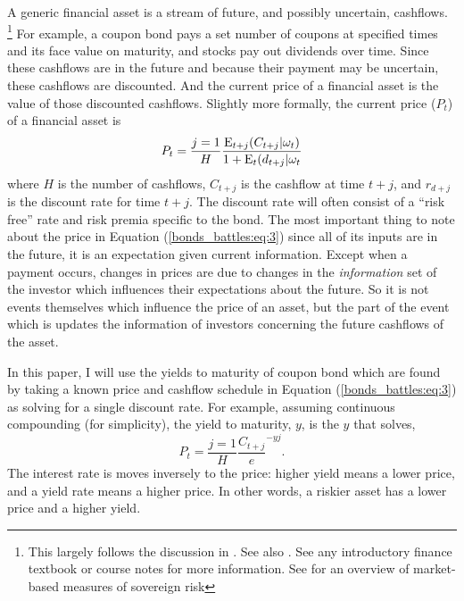 A generic financial asset is a stream of future, and possibly uncertain, cashflows.%
\footnote{
  This largely follows the discussion in \textcite[673]{GuidolinLaFerrara2010}.
  See also \textcite{HaberMitchenerOosterlinckEtAl2015}. 
  See any introductory finance textbook or course notes for more information.
  See \textcite{Chan-Lau2006} for an overview of market-based measures of sovereign risk
}
For example, a coupon bond pays a set number of coupons at specified times and its face value on maturity, 
and stocks pay out dividends over time.
Since these cashflows are in the future and because their payment may be uncertain, these cashflows are discounted.
And the current price of a financial asset is the value of those discounted cashflows.
Slightly more formally, the current price ($P_{t}$) of a financial asset is 
\begin{equation}
  \label{bonds_battles:eq:3}
  P_{t} = \frac{j = 1}{H} \frac{\operatorname{E}_{t + j}(C_{t + j} | \omega_{t})}{1 + \operatorname{E}_{t}(d_{t+j} | \omega_{t}}
\end{equation}
where $H$ is the number of cashflows, $C_{t + j}$ is the cashflow at time $t + j$, and $r_{d + j}$ is the discount rate for time $t + j$. 
The discount rate will often consist of a ``risk free'' rate and risk premia specific to the bond.
The most important thing to note about the price in Equation (\ref{bonds_battles:eq:3}) since all of its inputs are in the future, it is an expectation given current information.
Except when a payment occurs, changes in prices are due to changes in the  \textit{information} set of the investor which influences their expectations about the future.
So it is not events themselves which influence the price of an asset, but the part of the event which is updates the information of investors concerning the future cashflows of the asset.

In this paper, I will use the yields to maturity of coupon bond which are found by taking a known price and cashflow schedule in Equation (\ref{bonds_battles:eq:3}) as solving for a single discount rate.
For example, assuming continuous compounding (for simplicity), the yield to maturity, $y$, is the $y$ that solves,
\begin{equation}
  \label{bonds_battles:eq:5}
  P_{t} = \frac{j = 1}{H} \frac{C_{t + j}} e^{-y j} \text{.}
\end{equation}
The interest rate is moves inversely to the price: higher yield means a lower price, and a yield rate means a higher price.
In other words, a riskier asset has a lower price and a higher yield.

